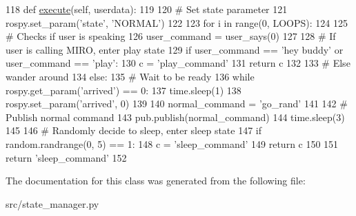 \begin{DoxyCode}
118     \textcolor{keyword}{def }\hyperlink{classstate__manager_1_1MIRO__Normal_a4133da39ee6ec170623fc1d457b0729a}{execute}(self, userdata):
119 
120         \textcolor{comment}{# Set state parameter}
121         rospy.set\_param(\textcolor{stringliteral}{'state'}, \textcolor{stringliteral}{'NORMAL'})
122 
123         \textcolor{keywordflow}{for} i \textcolor{keywordflow}{in} range(0, LOOPS):
124 
125             \textcolor{comment}{# Checks if user is speaking}
126             user\_command = user\_says(0)
127 
128             \textcolor{comment}{# If user is calling MIRO, enter play state}
129             \textcolor{keywordflow}{if} user\_command == \textcolor{stringliteral}{'hey buddy'} \textcolor{keywordflow}{or} user\_command == \textcolor{stringliteral}{'play'}:
130                 c = \textcolor{stringliteral}{'play\_command'}
131                 \textcolor{keywordflow}{return} c
132 
133             \textcolor{comment}{# Else wander around}
134             \textcolor{keywordflow}{else}:
135                 \textcolor{comment}{# Wait to be ready}
136                 \textcolor{keywordflow}{while} rospy.get\_param(\textcolor{stringliteral}{'arrived'}) == 0:
137                     time.sleep(1)
138                 rospy.set\_param(\textcolor{stringliteral}{'arrived'}, 0)
139 
140                 normal\_command = \textcolor{stringliteral}{'go\_rand'}
141 
142                 \textcolor{comment}{# Publish normal command}
143                 pub.publish(normal\_command)
144                 time.sleep(3)
145 
146             \textcolor{comment}{# Randomly decide to sleep, enter sleep state}
147             \textcolor{keywordflow}{if} random.randrange(0, 5) == 1:
148                 c = \textcolor{stringliteral}{'sleep\_command'}
149                 \textcolor{keywordflow}{return} c
150 
151         \textcolor{keywordflow}{return} \textcolor{stringliteral}{'sleep\_command'}
152 
\end{DoxyCode}


The documentation for this class was generated from the following file\+:\begin{DoxyCompactItemize}
\item 
src/state\+\_\+manager.\+py\end{DoxyCompactItemize}
